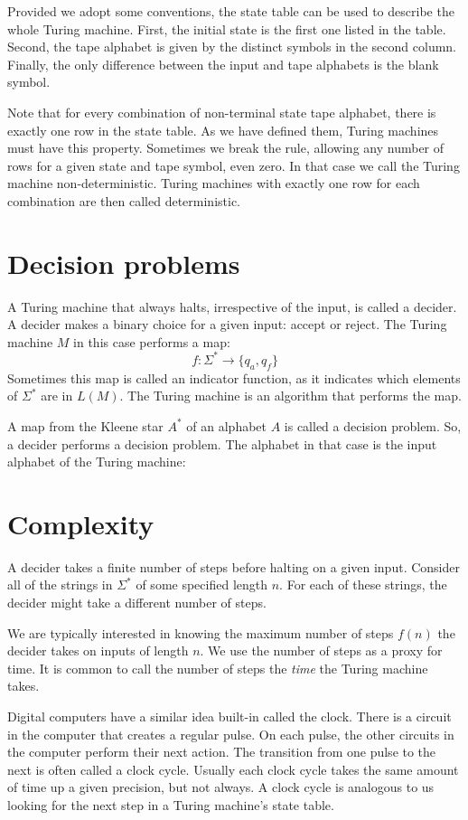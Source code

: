 \documentclass{iansnotes}
\begin{document}
  Provided we adopt some conventions, the state table can be used to describe the whole Turing machine.
  First, the initial state is the first one listed in the table.
  Second, the tape alphabet is given by the distinct symbols in the second column.
  Finally, the only difference between the input and tape alphabets is the blank symbol.
  
  Note that for every combination of non-terminal state tape alphabet, there is exactly one row in the state table.
  As we have defined them, Turing machines must have this property.
  Sometimes we break the rule, allowing any number of rows for a given state and tape symbol, even zero.
  In that case we call the Turing machine non-deterministic.
  Turing machines with exactly one row for each combination are then called deterministic.


\section{Decision problems}
  A Turing machine that always halts, irrespective of the input, is called a decider.  
  A decider makes a binary choice for a given input: accept or reject.
  The Turing machine \( M \) in this case performs a map:
  \[ f:\Sigma^* \rightarrow \{ q_a, q_f \} \]
  Sometimes this map is called an indicator function, as it indicates which elements of \( \Sigma^* \) are in \( L(M) \).
  The Turing machine is an algorithm that performs the map.
  
  A map from the Kleene star $A^*$ of an alphabet $A$ is called a decision problem.
  So, a decider performs a decision problem.
  The alphabet in that case is the input alphabet of the Turing machine:


\section{Complexity}
  A decider takes a finite number of steps before halting on a given input.
  Consider all of the strings in $\Sigma^*$ of some specified length $n$.
  For each of these strings, the decider might take a different number of steps.

  We are typically interested in knowing the maximum number of steps \( f(n) \) the decider takes on inputs of length \( n \).
  We use the number of steps as a proxy for time.
  It is common to call the number of steps the \emph{time} the Turing machine takes.

  Digital computers have a similar idea built-in called the clock.
  There is a circuit in the computer that creates a regular pulse.
  On each pulse, the other circuits in the computer perform their next action.
  The transition from one pulse to the next is often called a clock cycle.
  Usually each clock cycle takes the same amount of time up a given precision, but not always.
  A clock cycle is analogous to us looking for the next step in a Turing machine's state table.
  
\end{document}
